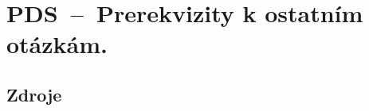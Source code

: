 

\graphicspath{{pds/pds_prerekvizity/figures}}


\chapter{PDS~--~Prerekvizity k ostatním otázkám.}





\section{Zdroje}

